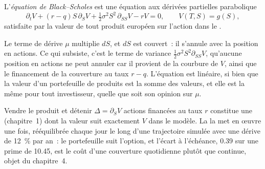 \begin{definition}\label{def:dv:black-scholes-three-ways:pde}
L'\emph{équation de Black--Scholes} est une
équation aux dérivées partielles parabolique
\[
\partial_tV+(r-q)S\,\partial_SV+\tfrac12\sigma^2S^2\,\partial_{SS}V-rV=0,
\qquad V(T,S)=g(S),
\]
satisfaite par la valeur de tout produit européen sur l'action dans le
.
\end{definition}

Le terme de dérive $\mu$ multiplie $dS$, et $dS$ est couvert~: il s'annule avec la
position en actions. Ce qui subsiste, c'est le terme de variance $\tfrac12\sigma^2S^2
\partial_{SS}V$, qu'aucune position en actions ne peut annuler car il provient de la
courbure de $V$, ainsi que le financement de la couverture au taux $r-q$. L'équation est
linéaire, si bien que la valeur d'un portefeuille de produits est la somme des valeurs, et
elle est la même pour tout investisseur, quelle que soit son opinion sur $\mu$.

\begin{remark}\label{rem:dv:black-scholes-three-ways:hedger}
Vendre le produit et détenir $\Delta=\partial_SV$ actions financées au taux $r$ constitue une
 (chapitre~1) dont la valeur suit exactement $V$ dans le modèle.
La  la met en œuvre une fois, rééquilibrée
chaque jour le long d'une trajectoire simulée avec une dérive de 12~\% par an~: le portefeuille suit
l'option, et l'écart à l'échéance, 0.39 sur une prime de 10.45, est le coût
d'une couverture quotidienne plutôt que continue, objet du chapitre~4.
\end{remark}

